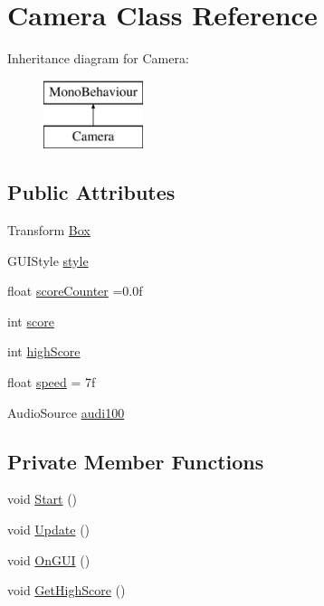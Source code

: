 \hypertarget{class_camera}{}\section{Camera Class Reference}
\label{class_camera}
Inheritance diagram for Camera\+:\begin{figure}[H]
\begin{center}
\leavevmode
\includegraphics[height=2.000000cm]{class_camera}
\end{center}
\end{figure}
\subsection*{Public Attributes}
\begin{DoxyCompactItemize}
\item 
Transform \hyperlink{class_camera_acfd163e2a143a6b425494de9e86c5e00}{Box}
\item 
G\+U\+I\+Style \hyperlink{class_camera_afaadb7e35bf0918a0abcb53e73a2c565}{style}
\item 
float \hyperlink{class_camera_a8b771a0c2cb6e4fd4b3213a87e0f1a88}{score\+Counter} =0.\+0f
\item 
int \hyperlink{class_camera_abf86e03ac82c531858df39468f8e190b}{score}
\item 
int \hyperlink{class_camera_a91a3b4274da61a63a00782824cf5542e}{high\+Score}
\item 
float \hyperlink{class_camera_a9afbcb25512024bd94c4abc84c85d651}{speed} = 7f
\item 
Audio\+Source \hyperlink{class_camera_a265abd887260923d3b565aed0688cda7}{audi100}
\end{DoxyCompactItemize}
\subsection*{Private Member Functions}
\begin{DoxyCompactItemize}
\item 
void \hyperlink{class_camera_a6dd760883224d50af4d916ca57a26370}{Start} ()
\item 
void \hyperlink{class_camera_a0dd18d8bd55c82e18a9ef12b036eedab}{Update} ()
\item 
void \hyperlink{class_camera_a59fc70f1cd765b02d2858e2fe51d2013}{On\+G\+UI} ()
\item 
void \hyperlink{class_camera_a15e8198aec6c455bfc5016d64152a92c}{Get\+High\+Score} ()
\end{DoxyCompactItemize}


